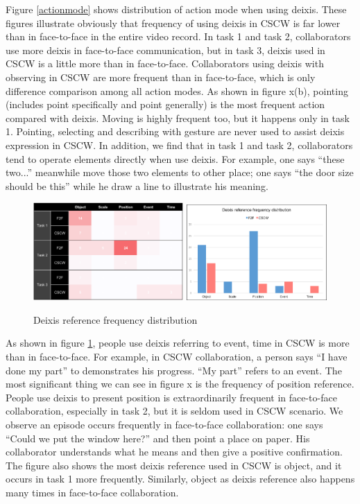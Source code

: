 \documentclass[12pt,twoside]{article}
\begin{document}
Figure \ref{actionmode} shows distribution of action mode when using deixis. These figures illustrate obviously that frequency of using deixis in CSCW is far lower than in face-to-face in the entire video record. In task 1 and task 2, collaborators use more deixis in face-to-face communication, but in task 3, deixis used in CSCW is a little more than in face-to-face.  Collaborators using deixis with observing in CSCW are more frequent than in face-to-face, which is only difference comparison among all action modes. As shown in figure x(b), pointing (includes point specifically and point generally) is the most frequent action compared with deixis. Moving is highly frequent too, but it happens only in task 1. Pointing, selecting and describing with gesture are never used to assist deixis expression in CSCW. In addition, we find that in task 1 and task 2, collaborators tend to operate elements directly when use deixis. For example, one says “these two...” meanwhile move those two elements to other place; one says “the door size should be this” while he draw a line to illustrate his meaning.

\begin{figure}
\includegraphics[width = 0.51\textwidth]{deixis_reference_a.png}
\includegraphics[width = 0.476\textwidth]{deixis_reference_b.png}
\caption{Deixis reference frequency distribution}
\label{Deixis_reference}
\end{figure}

As shown in figure \ref{Deixis_reference}, people use deixis referring to event, time in CSCW is more than in face-to-face. For example, in CSCW collaboration, a person says “I have done my part” to demonstrates his progress. “My part” refers to an event. The most significant thing we can see in figure x is the frequency of position reference. People use deixis to present position is extraordinarily frequent in face-to-face collaboration, especially in task 2, but it is seldom used in CSCW scenario. We observe an episode occurs frequently in face-to-face collaboration: one says “Could we put the window here?” and then point a place on paper. His collaborator understands what he means and then give a positive confirmation. The figure also shows the most deixis reference used in CSCW is object, and it occurs in task 1 more frequently. Similarly, object as deixis reference also happens many times in face-to-face collaboration. 
\end{document}

